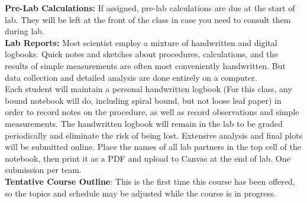 \documentclass[12pt]{article}
\begin{document}
\noindent
\textbf {Pre-Lab Calculations:} 
If assigned, pre-lab calculations are due at the start of lab.  They will be left at the front of the class in case you need to consult them during lab.\\

\noindent
\textbf {Lab Reports:} 
Most scientist employ a mixture of handwritten and digital logbooks.  Quick notes and sketches about procedures, calculations, and the results of simple measurements are often most conveniently handwritten.  But data collection and detailed analysis are done entirely on a computer.\\

Each student will maintain a personal handwritten logbook (For this
class, any bound notebook will do, including spiral bound, but not
loose leaf paper) in order to record notes on the procedure, as well
as record observations and simple measurements.  The handwritten
logbook will remain in the lab to be graded periodically and eliminate
the risk of being lost.  Extensive analysis and final plots will be
submitted online.  Place the names of all lab partners in the top cell
of the notebook, then print it as a PDF and upload to Canvas at the
end of lab.  One submission per team.\\

\noindent
\textbf {Tentative Course Outline}:
This is the first time this course has been offered, so the topics and schedule may be adjusted while the course is in progress.
\end{document}
